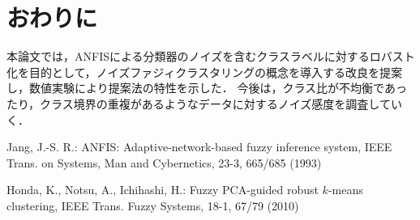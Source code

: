 \documentclass[twoside,twocolumn]{ujarticle}
\begin{document}
\begin{comment}
\begin{figure}[htb]
\centering
\texttt{[image: Final\_mf\_anfis\_50.png]}
\caption{従来法のメンバシップ関数 (ノイズ 50$\%$)}
\label{fig: membership of conventional ANFIS}
\end{figure}

\begin{figure}[htb]
\centering
\texttt{[image: Final\_mf\_noise\_50.png]}
\caption{提案法のメンバシップ関数 (ノイズ 50$\%$)}
\label{fig: membership of proposed robust ANFIS}
\end{figure}

次に，従来法と提案法によるANFISから50\%のノイズラベルを含む訓練データで得られたファジィメンバシップ関数を比較する．
図\ref{fig: membership of conventional ANFIS}と図\ref{fig: membership of proposed robust ANFIS}では，4つの変量についてのルールごとのメンバシップ関数$\mu_{kj} (x_{j})$を比較している．
従来法では，データセットにノイズを含むとき属性$x_1$のルール2において，尖った形状の関数が得られた．
このような尖った形状は，いずれかのノイズ個体に対して過適合を起こしうる．
対して提案法では，訓練データにノイズラベルが含まれている場合でも変わらず，なめらかなメンバシップ関数を構築できている．

\end{comment}

\section{おわりに}
本論文では，ANFISによる分類器のノイズを含むクラスラベルに対するロバスト化を目的として，ノイズファジィクラスタリングの概念を導入する改良を提案し，数値実験により提案法の特性を示した．
今後は，クラス比が不均衡であったり，クラス境界の重複があるようなデータに対するノイズ感度を調査していく．

\begin{thebibliography}{99}
	Jang, J.-S. R.: ANFIS: Adaptive-network-based fuzzy inference system, IEEE Trans. on Systems, Man and Cybernetics, 23-3, 665/685 (1993)

	\begin{comment}
	\bibitem{Takagi1985}
	Takagi, T., Sugeno, M.: Fuzzy identification of systems and its applications to modeling and control, IEEE Transactions on Systems, Man and Cybernetics, 15, 116/132 (1985)
\end{comment}


Honda, K., Notsu, A., Ichihashi, H.: Fuzzy PCA-guided robust $k$-means clustering, IEEE Trans. Fuzzy Systems, 18-1, 67/79 (2010)

\end{thebibliography}
\end{document}
